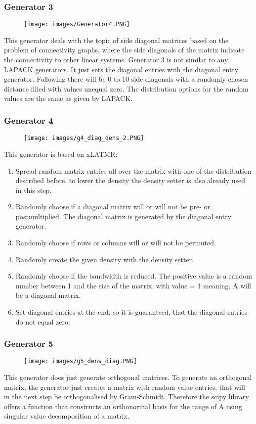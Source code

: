 \documentclass[parskip=full]{scrartcl}
\begin{document}
\newpage
\subsubsection{Generator 3}
\begin{figure}[h!]
	\texttt{[image: images/Generator4.PNG]}
\end{figure}
This generator deals with the topic of side diagonal matrices based on the problem of connectivity graphs, where the side diagonals of the matrix indicate the connectivity to other linear systems.
Generator 3 is not similar to any LAPACK generators. It just sets the diagonal entries with the diagonal entry generator. Following there will be 0 to 10 side diagonals with a randomly chosen distance filled with values unequal zero.
The distribution options for the random values are the same as given by LAPACK.

\newpage
\subsubsection{Generator 4}
\begin{figure}[h!]
	\texttt{[image: images/g4\_diag\_dens\_2.PNG]}
\end{figure}
This generator is based on xLATMR:
\begin{enumerate}
	\item Spread random matrix entries all over the matrix with one of the distribution described before. to lower the density the density setter is also already used in this step.
	\item Randomly choose if a diagonal matrix will or will not be pre- or postmultiplied. The diagonal matrix is generated by the diagonal entry generator.
	\item Randomly choose if rows or columns will or will not be permuted.
	\item Randomly create the given density with the density setter.
	\item Randomly choose if the bandwidth is reduced. The positive value is a random number between 1 and the size of the matrix, with value = 1 meaning, A will be a diagonal matrix.
	\item Set diagonal entries at the end, so it is guaranteed, that the diagonal entries do not equal zero.
\end{enumerate}

\newpage
\subsubsection{Generator 5}
\begin{figure}[h!]
	\texttt{[image: images/g5\_dens\_diag.PNG]}
\end{figure}
This generator does just generate orthogonal matrices. 
To generate an orthogonal matrix, the generator just creates a matrix with random value entries, that will in the next step be orthogonalised by Gram-Schmidt. Therefore the scipy library \cite{scipy} offers a function that constructs an orthonormal basis for the range of A using singular value decomposition of a matrix. 
\end{document}
